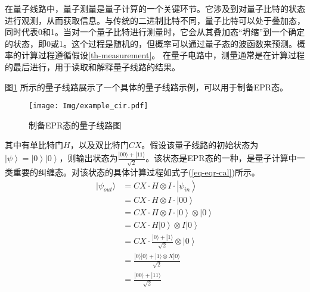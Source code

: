 在量子线路中，量子测量是量子计算的一个关键环节。它涉及到对量子比特的状态进行观测，从而获取信息。与传统的二进制比特不同，量子比特可以处于叠加态，同时代表0和1。当对一个量子比特进行测量时，它会从其叠加态“坍缩”到一个确定的状态，即0或1。这个过程是随机的，但概率可以通过量子态的波函数来预测。概率的计算过程遵循假设\ref{th-measurement}。
在量子电路中，测量通常是在计算过程的最后进行，用于读取和解释量子线路的结果。
\begin{example}
    \label{ex-epr}
    图\ref{fig:example_cir} 所示的量子线路展示了一个具体的量子线路示例，可以用于制备EPR态。
    \begin{figure}[!htbp]
        \centering
        \texttt{[image: Img/example\_cir.pdf]}
        \caption{制备EPR态的量子线路图}
        \label{fig:example_cir}
    \end{figure}
    其中有单比特门\(H\)，以及双比特门\(CX\)。假设该量子线路的初始状态为\(\left|\psi\right\rangle=\left|0\right\rangle\left|0\right\rangle\)，则输出状态为$\frac{|00\rangle+|11\rangle}{\sqrt{2}}$。该状态是EPR态的一种，是量子计算中一类重要的纠缠态。对该状态的具体计算过程如式子(\ref{eq-eqr-cal})所示。
\begin{equation}
    \label{eq-eqr-cal}
    \begin{aligned}
        |\psi_{out}\rangle &=  CX\cdot H\otimes I \cdot \left|\psi_{in}\right\rangle\\
        &= CX\cdot H\otimes I \cdot \left|00\right\rangle\\
        &= CX\cdot H\otimes I \cdot \left|0\right\rangle\otimes \left|0\right\rangle\\
        &= CX\cdot H\left|0\right\rangle\otimes I\left|0\right\rangle\\
        &= CX\cdot \frac{|0\rangle+|1\rangle}{\sqrt{2}} \otimes\left|0\right\rangle\\
        &= \frac{|0\rangle|0\rangle+|1\rangle\otimes X|0\rangle}{\sqrt{2}}\\
        &=\frac{|00\rangle+|11\rangle}{\sqrt{2}}
    \end{aligned}
\end{equation}

\end{example}

